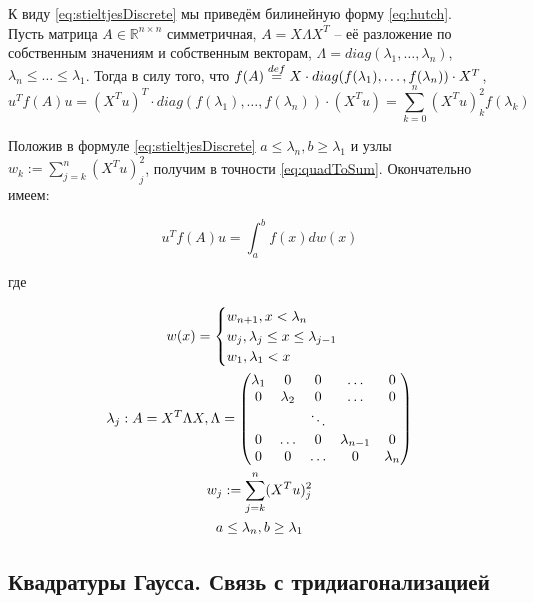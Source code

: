 К виду \eqref{eq:stieltjesDiscrete} мы приведём билинейную форму \eqref{eq:hutch}. \\

Пусть матрица $ A \in \mathds{R}^{n \times n} $ симметричная, $ A = X \Lambda X^T $ -- её разложение по собственным значениям и собственным векторам, $ \Lambda = diag(\lambda_1, \dots, \lambda_n) $, $ \lambda_n \le \dots \le \lambda_1 $.
Тогда в силу того, что
$ f(A) \overset{def}= X \cdot diag(f(\lambda_1), \dots, f(\lambda_n)) \cdot X^T $,
\begin{equation} \label{eq:quadToSum}
    u^T f(A) u = (X^T u)^T \cdot diag(f(\lambda_1), \dots, f(\lambda_n)) \cdot (X^Tu) = \sum_{k=0}^n (X^Tu)_k^2 f(\lambda_k)
\end{equation}

Положив в формуле \eqref{eq:stieltjesDiscrete} $ a \le \lambda_n, b \ge \lambda_1 $ и узлы $ w_k := \sum_{j=k}^n (X^T u)_j^2 $, получим в точности \eqref{eq:quadToSum}.
Окончательно имеем:

\begin{equation} \label{eq:quadToIntegral}
    \boxed{ u^T f(A) u = \int_a^b f(x) d w(x) }
\end{equation}

где

\begin{gather*}
    w(x) = \begin{cases}
        w_{n+1}, x < \lambda_n \\
        w_j, \lambda_j \le x \le \lambda_{j-1} \\
        w_1, \lambda_1 < x
    \end{cases} \\
    \lambda_j : A = X^T \Lambda X, \Lambda = \begin{pmatrix}
        \lambda_1 & 0 & 0 & \dots & 0 \\
         0 & \lambda_2 & 0 & \dots & 0 \\
         & & \ddots \\
         0 & \dots & 0 & \lambda_{n-1} & 0 \\
         0 & 0 & \dots & 0 & \lambda_n
    \end{pmatrix} \\
    w_j := \sum_{j=k}^n (X^T u)^2_j \\
    a \le \lambda_n, \space b \ge \lambda_1 \\
\end{gather*}

\subsection{Квадратуры Гаусса. Связь с тридиагонализацией}

